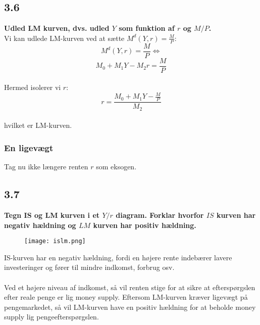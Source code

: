 \documentclass[a4paper, 12pt]{article}
\begin{document}
\subsection*{3.6}
\textbf{Udled LM kurven, dvs. udled $Y$ som funktion af $r$ og $M/P$.}
\\
Vi kan udlede LM-kurven ved at sætte $M^{d} (Y,r) = \frac{M}{P}$:
$$M^{d} (Y,r) = \frac{M}{P} \Leftrightarrow$$
$$M_{0}+M_{1}Y - M_{2}r = \dfrac{M}{P} $$
\\
Hermed isolerer vi $r$:
$$r = \dfrac{M_{0}+M_{1}Y -\frac{M}{P}}{M_{2}}$$
\\
hvilket er LM-kurven.

\subsubsection*{En ligevægt}
Tag nu ikke længere renten $r$ som eksogen.

\subsection*{3.7}
\textbf{Tegn IS og LM kurven i et $Y/r$ diagram. Forklar hvorfor $IS$ kurven har negativ hældning og $LM$ kurven har positiv hældning.}

\FloatBarrier
\begin{center}
	\begin{figure}[!ht]	
		\centering	
\texttt{[image: islm.png]}
		\caption{}
	\end{figure}
\end{center}
\FloatBarrier


IS-kurven har en negativ hældning, fordi en højere rente indebærer lavere investeringer og fører til mindre indkomst, forbrug osv.
\\\\
Ved et højere niveau af indkomst, så vil renten stige for at sikre at efterspørgslen efter reale penge er lig money supply. Eftersom LM-kurven kræver ligevægt på pengemarkedet, så vil LM-kurven have en positiv hældning for at beholde money supply lig pengeefterspørgslen.

\end{document}
